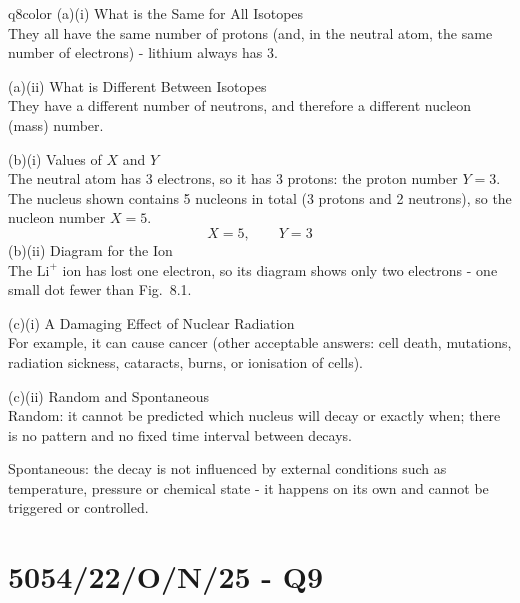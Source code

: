 \documentclass[11pt,a4paper]{article}
\newcommand{\qsection}[1]{\needspace{10\baselineskip}\section*{#1}}
\begin{document}
\begin{ansbox}{q8color}
(a)(i) What is the Same for All Isotopes\\[4pt]
They all have the same number of protons (and, in the neutral atom, the same number of electrons) - lithium always has 3.

\vspace{4pt}
(a)(ii) What is Different Between Isotopes\\[4pt]
They have a different number of neutrons, and therefore a different nucleon (mass) number.

\vspace{4pt}
(b)(i) Values of $X$ and $Y$\\[4pt]
The neutral atom has 3 electrons, so it has 3 protons: the proton number $Y = 3$. The nucleus shown contains 5 nucleons in total (3 protons and 2 neutrons), so the nucleon number $X = 5$.
\[
X = \boxed{5}, \qquad Y = \boxed{3}
\]
\clearpage
\vspace{4pt}
(b)(ii) Diagram for the Ion\\[4pt]
The $\mathrm{Li}^{+}$ ion has lost one electron, so its diagram shows only two electrons - one small dot fewer than Fig.\ 8.1.

\vspace{4pt}
(c)(i) A Damaging Effect of Nuclear Radiation\\[4pt]
For example, it can cause cancer (other acceptable answers: cell death, mutations, radiation sickness, cataracts, burns, or ionisation of cells).

\vspace{4pt}
(c)(ii) Random and Spontaneous\\[4pt]
Random: it cannot be predicted which nucleus will decay or exactly when; there is no pattern and no fixed time interval between decays.

Spontaneous: the decay is not influenced by external conditions such as temperature, pressure or chemical state - it happens on its own and cannot be triggered or controlled.
\end{ansbox}

\qsection{5054/22/O/N/25 - Q9}\label{p2_on25:q9}
\end{document}
